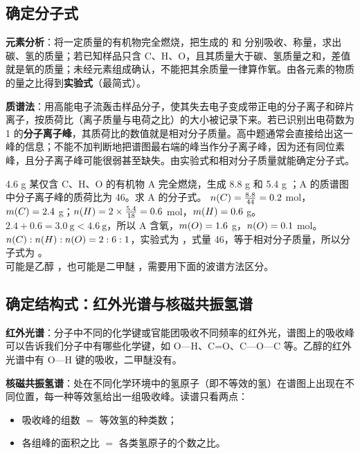 \subsection{确定分子式}
\textbf{元素分析}：将一定质量的有机物完全燃烧，把生成的  和  分别吸收、称量，求出碳、氢的质量；若已知样品只含 C、H、O，且其质量大于碳、氢质量之和，差值就是氧的质量；未经元素组成确认，不能把其余质量一律算作氧。由各元素的物质的量之比得到\textbf{实验式}（最简式）。

\textbf{质谱法}：用高能电子流轰击样品分子，使其失去电子变成带正电的分子离子和碎片离子，按质荷比（离子质量与电荷之比）的大小被记录下来。若已识别出电荷数为 1 的\textbf{分子离子峰}，其质荷比的数值就是相对分子质量。高中题通常会直接给出这一峰的信息；不能不加判断地把谱图最右端的峰当作分子离子峰，因为还有同位素峰，且分子离子峰可能很弱甚至缺失。由实验式和相对分子质量就能确定分子式。

\begin{liti}[基础]
4.6 g 某仅含 C、H、O 的有机物 A 完全燃烧，生成 8.8 g  和 5.4 g ；A 的质谱图中分子离子峰的质荷比为 46。求 A 的分子式。
\tcblower
\jie $n(C)=\frac{8.8}{44}=0.2$ mol，$m(C)=2.4$ g；$n(H)=2\times\frac{5.4}{18}=0.6$ mol，$m(H)=0.6$ g。$2.4+0.6=3.0\ \text{g}<4.6\ \text{g}$，所以 A 含氧，$m(O)=1.6$ g，$n(O)=0.1$ mol。$n(C):n(H):n(O)=2:6:1$，实验式为 ，式量 46，等于相对分子质量，所以分子式为 。\\
\dianbo {} 可能是乙醇 ，也可能是二甲醚 ，需要用下面的波谱方法区分。
\end{liti}

\subsection{确定结构式：红外光谱与核磁共振氢谱}
\textbf{红外光谱}：分子中不同的化学键或官能团吸收不同频率的红外光，谱图上的吸收峰可以告诉我们分子中有哪些化学键，如 O—H、C=O、C—O—C 等。乙醇的红外光谱中有 O—H 键的吸收，二甲醚没有。

\textbf{核磁共振氢谱}：处在不同化学环境中的氢原子（即不等效的氢）在谱图上出现在不同位置，每一种等效氢给出一组吸收峰。读谱只看两点：
\begin{itemize}
\item 吸收峰的组数 $=$ 等效氢的种类数；
\item 各组峰的面积之比 $=$ 各类氢原子的个数之比。
\end{itemize}

